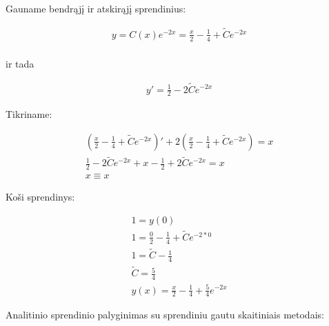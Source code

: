 \documentclass[11pt]{article}
\begin{document}
\newpage

Gauname bendrąjį ir atskirąjį sprendinius:

\begin{equation}
\begin{split}
y=C(x)e^{-2x}=\frac{x}{2}-\frac{1}{4}+\widetilde{C}e^{-2x}\\
\end{split}
\end{equation}

ir tada

\begin{equation}
\begin{split}
y'=\frac{1}{2}-2\widetilde{C}e^{-2x}
\end{split}
\end{equation}

Tikriname:

\begin{equation}
\begin{split}
\left(\frac{x}{2}-\frac{1}{4}+\widetilde{C}e^{-2x}\right)'+2\left(\frac{x}{2}-\frac{1}{4}+\widetilde{C}e^{-2x}\right)=x\\
\frac{1}{2}-2\widetilde{C}e^{-2x}+x-\frac{1}{2}+2\widetilde{C}e^{-2x}=x\\
x\equiv x
\end{split}
\end{equation}

Koši sprendinys:

\begin{equation}
\begin{split}
1=y(0)\\
1=\frac{0}{2}-\frac{1}{4}+\widetilde{C}e^{-2*0}\\
1=\widetilde{C}-\frac{1}{4}\\
\widetilde{C}=\frac{5}{4}\\
y(x)=\frac{x}{2}-\frac{1}{4}+\frac{5}{4}e^{-2x}
\end{split}
\end{equation}

Analitinio sprendinio palyginimas su sprendiniu gautu skaitiniais metodais:
\end{document}
